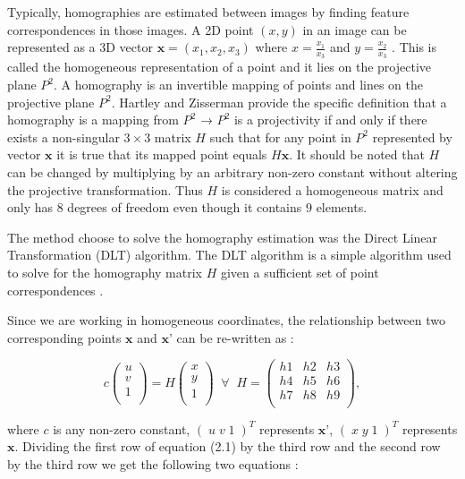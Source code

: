 Typically, homographies are estimated between images by finding feature correspondences in those images. A 2D point $(x,y)$ in an image can be represented as a 3D vector $\textbf{x} = (x_1, x_2, x_3)$ where $x = \frac{x_1}{x_3}$ and $y = \frac{x_2}{x_3}$ \cite{Homography2009}. This is called the homogeneous representation of a point and it lies on the projective plane $P^2$. A homography is an invertible mapping of points and lines on the projective plane $P^2$. Hartley and Zisserman \cite{Hartley2004} provide the specific definition that a homography is a mapping from $P^2$ → $P^2$ is a projectivity if and only if there exists a non-singular $3\times3$ matrix $H$ such that for any point in $P^2$ represented by vector $\textbf{x}$ it is true that its mapped point equals $H\textbf{x}$. It should be noted that $H$ can be changed by multiplying by an arbitrary non-zero constant without altering the projective transformation. Thus $H$ is considered a homogeneous matrix and only has $8$ degrees of freedom even though it contains $9$ elements.

The method choose to solve the homography estimation was the Direct Linear Transformation (DLT) \cite{Impa2009,Hartley2004} algorithm. The DLT algorithm is a simple algorithm used to solve for the homography matrix $H$ given a sufficient set of point correspondences \cite{Homography2009}.

Since we are working in homogeneous coordinates, the relationship between two corresponding points $\textbf{x}$ and $\textbf{x'}$ can be re-written as \cite{Homography2009}:

$$c\begin{pmatrix}u\\ v\\ 1\\\end{pmatrix} = H\begin{pmatrix}x\\ y\\ 1\\\end{pmatrix} \;\; \forall \;\; H=\begin{pmatrix}h1 & h2 & h3\\ h4 & h5 & h6\\ h7 & h8 & h9\\\end{pmatrix},$$

where $c$ is any non-zero constant, $(\; u \; v \; 1 \;)^T$ represents $\textbf{x'}$, $(\; x \; y \; 1 \;)^T$ represents $\textbf{x}$. Dividing the first row of equation (2.1) by the third row and the second row by the third row we get the following two equations \cite{Homography2009}:

